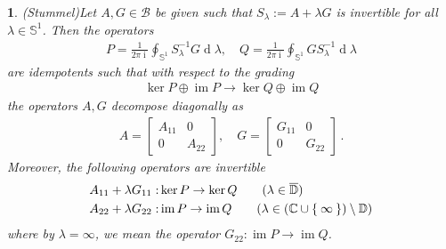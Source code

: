 \documentclass[a4paper,10pt]{article}
\numberwithin{equation}{section}
\theoremstyle{plain}
\newtheorem{thm}{\protect\theoremname}[section]
\theoremstyle{plain}
\theoremstyle{plain}
\theoremstyle{plain}
\theoremstyle{plain}
\theoremstyle{remark}
\theoremstyle{definition}
\theoremstyle{plain}
\providecommand{\theoremname}{Theorem}
\newcommand{\ii}{\operatorname{i}}
\newcommand{\bS}{\mathbb{S}}
\newcommand{\CC}{\mathbb{C}}
\newcommand{\calB}{\mathcal{B}}
\newcommand{\dif}{\operatorname{d}}
\newcommand{\im}{\operatorname{im}}
\newcommand{\eql}[1]{\begin{align}#1\end{align}}
\newcommand{\DD}{\mathbb{D}}
\begin{document}
		\begin{thm}(Stummel)\label{thm:stummel}
			Let $A,G\in\calB$ be given such that  $S_\lambda:=A+\lambda G$ is invertible for all $\lambda\in \bS^1$. Then the operators \eql{P=\frac{1}{2\pi \ii}\oint_{\bS^1}S_\lambda^{-1}G\dif{\lambda},\quad Q=\frac{1}{2\pi \ii}\oint_{\bS^1}GS_\lambda^{-1}\dif{\lambda} \label{eq:stummel projections}} are idempotents such that with respect to the grading \eql{\ker P\oplus \im P\to \ker Q\oplus \im Q \label{eq:stummel grading}} the operators $A,G$ decompose diagonally as \eql{\label{eq:stummel decomposition}A=\begin{bmatrix}A_{11} & 0 \\ 0 & A_{22}\end{bmatrix},\quad G=\begin{bmatrix}G_{11} & 0 \\ 0 & G_{22}\end{bmatrix} \,.} Moreover, the following operators are invertible \eql{A_{11}+\lambda G_{11}: &\ker P\to \ker Q \qquad(\lambda\in\overline{\DD}) \label{eq:stummel invertible in disk} \\ A_{22} + \lambda G_{22}:&\im P\to \im Q \qquad (\lambda\in \left(\CC\cup\Set{\infty}\right)\setminus \DD) \label{eq:stummel invertible outside disk}} where by $\lambda=\infty$, we mean the operator $G_{22}:\im P\to \im Q$.
		\end{thm}
		
\end{document}
